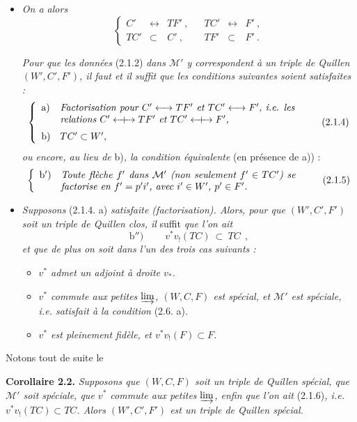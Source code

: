 \documentclass[11pt]{article}
\newcommand{\msp}[1]{\marginpar{\footnotesize [#1]}}
\newcommand{\Qcouple}{\mathrel{\leftarrow\mkern-9mu{+}\mkern-9mu\rightarrow}}
\newcommand{\M}{\mathcal{M}}
\begin{document}
\begin{itemize}
\item[1°)] \textit{On a alors}
\[
\left\{
\begin{array}{rclcrcl}
C' & \longleftrightarrow & TF'\ , & & TC' & \longleftrightarrow & F'\ ,\\
TC' & \subset & C'\ , & & TF' & \subset & F'\ .
\end{array}\right.
\tag*{(2.1.3)}
\]

\textit{Pour que les données} (2.1.2) \textit{dans $\M'$ y correspondent à un triple de Quillen $(W',C',F')$, il faut et il suffit que les conditions suivantes soient satisfaites :}
\msp{page 16}
\[
\left\{
\begin{array}{ll}
\text{a)} & \parbox[t]{0.7\textwidth}{\textit{Factorisation pour $C' \longleftrightarrow TF'$ et $TC' \longleftrightarrow F'$, i.e. les relations $C' \Qcouple TF'$ et $TC' \Qcouple F'$,}}\\[4ex]
\text{b)} & TC' \subset W',
\end{array}\right. %
\tag*{(2.1.4)}
\]
\textit{ou encore, au lieu de} b)\textit{, la condition équivalente} (en présence de a)) :
\[
\left\{
\begin{array}{ll}
\text{b$'$)} & \parbox[t]{0.7\textwidth}{\textit{Toute flèche $f'$ dans $\M'$ (non seulement $f' \in TC'$) se factorise en $f' = p'i'$, avec $i' \in W'$, $p' \in F'$.}}
\end{array}\right.
\tag*{(2.1.5)}
\]
\item[2°)] \textit{Supposons} (2.1.4. a) \textit{satisfaite (factorisation). Alors, pour que $(W',C',F')$ soit un triple de Quillen clos, il} suffit \textit{que l'on ait}
\[
\text{b$''$)}\qquad \boxed{\ v^*v_!(TC)\ \subset\ TC\ }\ ,
\tag*{(2.1.6)}
\]
\textit{et que de plus on soit dans l'un des trois cas suivants :}
\begin{itemize}
\item[A)] \textit{$v^*$ admet un adjoint à droite $v_*$.}
\item[B)] \textit{$v^*$ commute aux petites} $\varinjlim$\textit{, $(W,C,F)$ est spécial, et $\M'$ est spéciale, i.e. satisfait à la condition} (2.6. a).
\item[C)] \textit{$v^*$ est pleinement fidèle, et $v^*v_!(F) \subset F$.}
\end{itemize}
\end{itemize}
Notons tout de suite le

\textbf{Corollaire 2.2.} \textit{Supposons que $(W,C,F)$ soit un triple de Quillen spécial, que $\M'$ soit spéciale, que $v^*$ commute aux petites} $\varinjlim$\textit{, enfin que l'on ait} (2.1.6)\textit{, i.e. $v^*v_!(TC) \subset TC$. Alors $(W',C',F')$ est un triple de Quillen spécial.}
\end{document}
